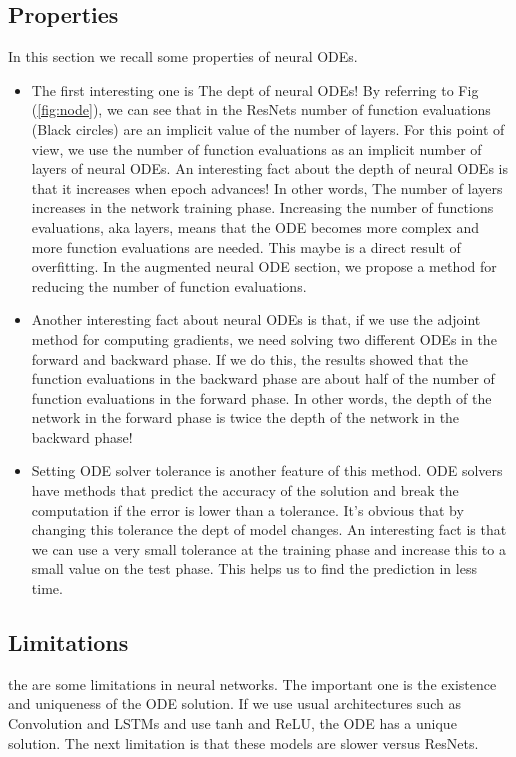 \documentclass{article}
\newcommand\pef[1]{(\ref{#1})}
\begin{document}
	\subsection{Properties}
	In this section we recall some properties of neural ODEs. 
	\\
	\begin{itemize}
		\item The first interesting one is The dept of neural ODEs! By referring to Fig \pef{fig:node}, we can see that in the ResNets number of function evaluations (Black circles) are an implicit value of the number of layers. For this point of view, we use the number of function evaluations as an implicit number of layers of neural ODEs. An interesting fact about the depth of neural ODEs is that it increases when epoch advances! In other words, The number of layers increases in the network training phase. Increasing the number of functions evaluations, aka layers, means that the ODE becomes more complex and more function evaluations are needed. This maybe is a direct result of overfitting. In the augmented neural ODE section, we propose a method for reducing the number of function evaluations.
		
		\item Another interesting fact about neural ODEs is that, if we use the adjoint method for computing gradients, we need solving two different ODEs in the forward and backward phase. If we do this, the results showed that the function evaluations in the backward phase are about half of the number of function evaluations in the forward phase. In other words, the depth of the network in the forward phase is twice the depth of the network in the backward phase!
		
		\item Setting ODE solver tolerance is another feature of this method. ODE solvers have methods that predict the accuracy of the solution and break the computation if the error is lower than a tolerance. It's obvious that by changing this tolerance the dept of model changes. An interesting fact is that we can use a very small tolerance at the training phase and increase this to a small value on the test phase. This helps us to find the prediction in less time.
	\end{itemize}
	
	\subsection{Limitations}
	the are some limitations in neural networks. The important one is the existence and uniqueness of the ODE solution. If we use usual architectures such as Convolution and LSTMs and use tanh and ReLU, the ODE has a unique solution. The next limitation is that these models are slower versus ResNets.
	
\end{document}
